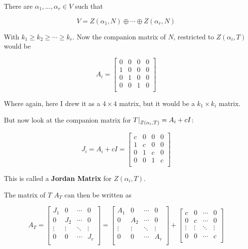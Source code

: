 \documentclass[12pt]{article}
\begin{document}
  There are $\alpha_1, \dots, \alpha_r \in V$ such that

  \[
    V = Z(\alpha_1, N) \oplus \cdots \oplus Z(\alpha_r, N)
  \]

  With $k_1 \ge k_2 \ge \cdots \ge k_r$. Now the companion matrix of $N$,
  restricted to $Z(\alpha_i, T)$ would be

  \[
    A_i = \begin{bmatrix}
      0 & 0 & 0 & 0 \\
      1 & 0 & 0 & 0 \\
      0 & 1 & 0 & 0 \\
      0 & 0 & 1 & 0 \\
    \end{bmatrix}
  \]

  Where again, here I drew it as a $4 \times 4$ matrix, but it would be a $k_1
  \times k_i$ matrix.

  But now look at the companion matrix for $\restr{T}{Z(\alpha_i, T)} = A_i +
  cI$:

  \[
    J_i = A_i + cI =
    \begin{bmatrix}
      c & 0 & 0 & 0 \\
      1 & c & 0 & 0 \\
      0 & 1 & c & 0 \\
      0 & 0 & 1 & c \\
    \end{bmatrix}
  \]

  This is called a {\bf Jordan Matrix} for $Z(\alpha_i, T)$.

  The matrix of $T$ $A_T$ can then be written as

  \[
    A_T = \begin{bmatrix}
      J_1 & 0 & \cdots & 0 \\
      0 & J_2 & \cdots & 0 \\
      \vdots & \vdots & \ddots & \vdots \\
      0 & 0 & \cdots & J_r \\
    \end{bmatrix}
    =
    \begin{bmatrix}
      A_1 & 0 & \cdots & 0 \\
      0 & A_2 & \cdots & 0 \\
      \vdots & \vdots & \ddots & \vdots \\
      0 & 0 & \cdots & A_r \\
    \end{bmatrix}
    +
    \begin{bmatrix}
      c & 0 & \cdots & 0 \\
      0 & c & \cdots & 0 \\
      \vdots & \vdots & \ddots & \vdots \\
      0 & 0 & \cdots & c \\
    \end{bmatrix}
  \]
\end{document}
